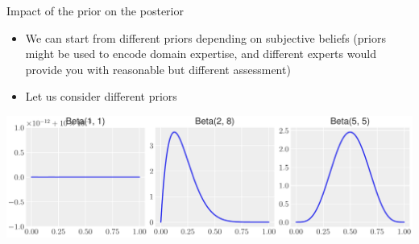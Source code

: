 \documentclass[
  13pt,
  ignorenonframetext,
]{beamer}
\begin{document}
\begin{frame}{Impact of the prior on the posterior}
\protect\hypertarget{impact-of-the-prior-on-the-posterior}{}
\begin{itemize}
\item
  We can start from different priors depending on subjective beliefs
  (priors might be used to encode domain expertise, and different
  experts would provide you with reasonable but different assessment)
\item
  Let us consider different priors
\end{itemize}

\begin{center}\includegraphics{3-coinTossing_files/figure-beamer/unnamed-chunk-8-1} \end{center}
\end{frame}
\end{document}
